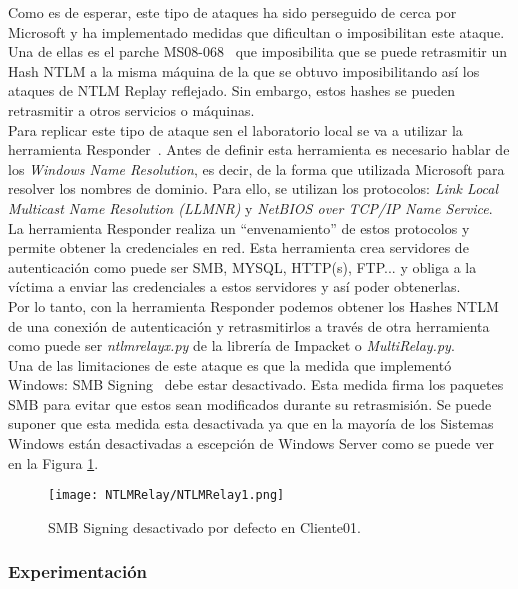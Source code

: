 Como es de esperar, este tipo de ataques ha sido perseguido de cerca por Microsoft y ha implementado medidas que dificultan o imposibilitan este ataque. Una de ellas es el parche MS08-068~\cite{Capitulo5:MS08-068} que imposibilita que se puede retrasmitir un Hash NTLM a la misma máquina de la que se obtuvo imposibilitando así los ataques de NTLM Replay reflejado. Sin embargo, estos hashes se pueden retrasmitir a otros servicios o máquinas. \\

Para replicar este tipo de ataque sen el laboratorio local se va a utilizar la herramienta Responder~\cite{Capitulo5:Responder}. Antes de definir esta herramienta es necesario hablar de los {\it Windows Name Resolution}, es decir, de la forma que utilizada Microsoft para resolver los nombres de dominio. Para ello, se utilizan los protocolos: {\it Link Local Multicast Name Resolution (LLMNR)} y {\it NetBIOS over TCP/IP Name Service}. La herramienta Responder realiza un ``envenamiento'' de estos protocolos y permite obtener la credenciales en red. Esta herramienta crea servidores de autenticación como puede ser SMB, MYSQL, HTTP(s), FTP... y obliga a la víctima a enviar las credenciales a estos servidores y así poder obtenerlas. \\

Por lo tanto, con la herramienta Responder podemos obtener los Hashes NTLM de una conexión de autenticación y retrasmitirlos a través de otra herramienta como puede ser {\it ntlmrelayx.py} de la librería de Impacket o {\it MultiRelay.py}. \\

Una de las limitaciones de este ataque es que la medida que implementó Windows: SMB Signing~\cite{Capitulo5:SMBSigning} debe estar desactivado. Esta medida firma los paquetes SMB para evitar que estos sean modificados durante su retrasmisión. Se puede suponer que esta medida esta desactivada ya que en la mayoría de los Sistemas Windows están desactivadas a escepción de Windows Server como se puede ver en la Figura \ref{NTLMRelay1}.

\begin{figure}[H] %
\begin{center}
\texttt{[image: NTLMRelay/NTLMRelay1.png]}
\end{center}
\caption{SMB Signing desactivado por defecto en Cliente01.}
\label{NTLMRelay1}
\end{figure}

\subsubsection{Experimentación}

